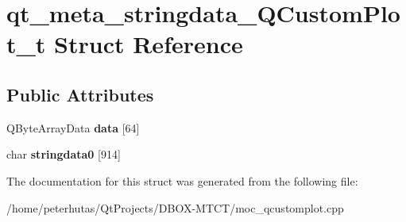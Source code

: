 \hypertarget{structqt__meta__stringdata___q_custom_plot__t}{}\section{qt\+\_\+meta\+\_\+stringdata\+\_\+\+Q\+Custom\+Plot\+\_\+t Struct Reference}
\label{structqt__meta__stringdata___q_custom_plot__t}
\subsection*{Public Attributes}
\begin{DoxyCompactItemize}
\item 
\mbox{\label{structqt__meta__stringdata___q_custom_plot__t_a8977178dafbbe5777e63d644f3bf262a}} 
Q\+Byte\+Array\+Data {\bfseries data} \mbox{[}64\mbox{]}
\item 
\mbox{\label{structqt__meta__stringdata___q_custom_plot__t_ad63fb62139acbe99179838dc5bd42bbb}} 
char {\bfseries stringdata0} \mbox{[}914\mbox{]}
\end{DoxyCompactItemize}


The documentation for this struct was generated from the following file\+:\begin{DoxyCompactItemize}
\item 
/home/peterhutas/\+Qt\+Projects/\+D\+B\+O\+X-\/\+M\+T\+C\+T/moc\+\_\+qcustomplot.\+cpp\end{DoxyCompactItemize}
